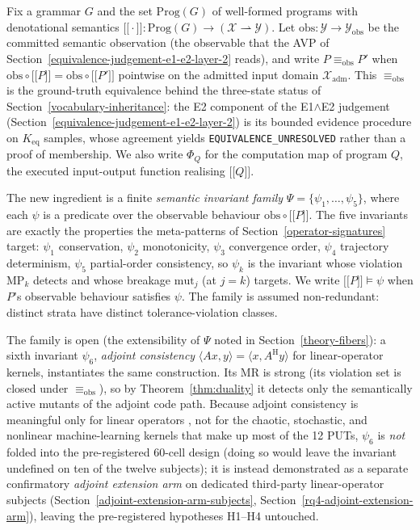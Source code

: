 \documentclass[review,12pt,authoryear]{elsarticle}
\providecommand{\llbracket}{\mathopen{\lbrack\!\lbrack}}
\providecommand{\rrbracket}{\mathclose{\rbrack\!\rbrack}}
\begin{document}
Fix a grammar $G$ and the set $\mathrm{Prog}(G)$ of well-formed programs
with denotational semantics
$\llbracket\cdot\rrbracket : \mathrm{Prog}(G) \to (\mathcal{X} \rightharpoonup \mathcal{Y})$.
Let $\mathrm{obs} : \mathcal{Y} \to \mathcal{Y}_{\mathrm{obs}}$ be the committed
semantic observation (the observable that the AVP of Section~\ref{equivalence-judgement-e1-e2-layer-2} reads), and
write $P \equiv_{\mathrm{obs}} P'$ when
$\mathrm{obs} \circ \llbracket P \rrbracket = \mathrm{obs} \circ \llbracket P' \rrbracket$
pointwise on the admitted input domain $\mathcal{X}_{\mathrm{adm}}$.
This $\equiv_{\mathrm{obs}}$ is the ground-truth equivalence behind the
three-state status of Section~\ref{vocabulary-inheritance}: the E2 component of the E1$\wedge$E2 judgement
(Section~\ref{equivalence-judgement-e1-e2-layer-2}) is its bounded evidence procedure on $K_{\mathrm{eq}}$
samples, whose agreement yields \texttt{EQUIVALENCE\_UNRESOLVED} rather
than a proof of membership. We also write $\Phi_Q$ for the computation
map of program $Q$, the executed input-output function realising
$\llbracket Q \rrbracket$.

The new ingredient is a finite \emph{semantic invariant family}
$\Psi = \{\psi_1, \dots, \psi_5\}$, where each $\psi$ is a predicate over
the observable behaviour $\mathrm{obs} \circ \llbracket P \rrbracket$. The five
invariants are exactly the properties the meta-patterns of Section~\ref{operator-signatures} target:
$\psi_1$ conservation, $\psi_2$ monotonicity, $\psi_3$ convergence order,
$\psi_4$ trajectory determinism, $\psi_5$ partial-order consistency, so
$\psi_k$ is the invariant whose violation MP$_k$ detects and whose
breakage $\mathrm{mut}_j$ (at $j=k$) targets. We write
$\llbracket P \rrbracket \models \psi$ when $P$'s observable behaviour
satisfies $\psi$. The family is assumed non-redundant: distinct strata
have distinct tolerance-violation classes.

The family is open (the extensibility of $\Psi$ noted in Section~\ref{theory-fibers}): a sixth
invariant $\psi_6$, \emph{adjoint consistency}
$\langle A x, y\rangle = \langle x, A^{\mathrm{H}} y\rangle$ for
linear-operator kernels, instantiates the same construction. Its MR is
strong (its violation set is closed under $\equiv_{\mathrm{obs}}$), so by
Theorem~\ref{thm:duality} it detects only the semantically active mutants of the adjoint code
path. Because adjoint consistency is meaningful only for linear operators
, not for the chaotic, stochastic, and nonlinear machine-learning
kernels that make up most of the 12 PUTs, $\psi_6$ is \emph{not} folded
into the pre-registered 60-cell design (doing so would leave the invariant
undefined on ten of the twelve subjects); it is instead demonstrated as a
separate confirmatory \emph{adjoint extension arm} on dedicated
third-party linear-operator subjects (Section~\ref{adjoint-extension-arm-subjects}, Section~\ref{rq4-adjoint-extension-arm}), leaving the
pre-registered hypotheses H1--H4 untouched.
\end{document}
